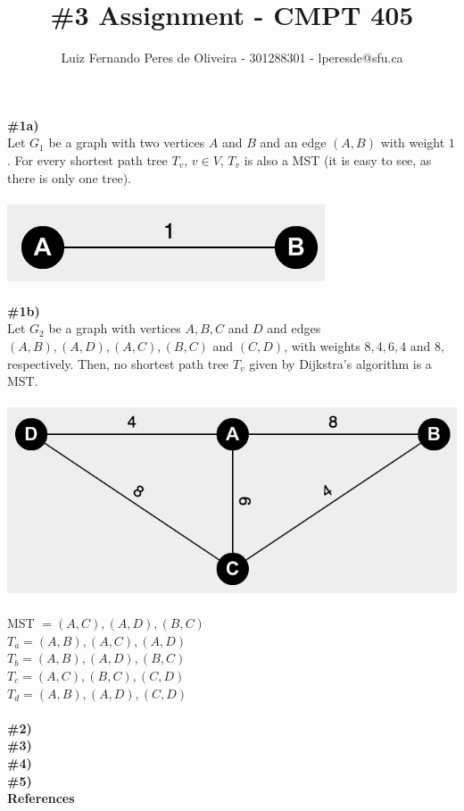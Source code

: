 \documentclass{article}
\title{\#3 Assignment - CMPT 405}
\author{Luiz Fernando Peres de Oliveira - 301288301 - lperesde@sfu.ca}
\begin{document}
\maketitle
\textbf{\#1a)}
\\
Let $G_1$ be a graph with two vertices $A$ and $B$ and an edge $(A, B)$ with weight $1$. For every shortest path tree $T_v$, $v \in V$, $T_v$ is also a MST (it is easy to see, as there is only one tree).
\\
\\
\includegraphics[scale=0.6]{simple_graph_hw3}
\\
\\
\textbf{\#1b)}
\\
Let $G_2$ be a graph with vertices $A, B, C$ and $D$ and edges $(A, B), (A, D), (A,C), (B,C)$ and $(C,D)$, with weights $8, 4, 6, 4 \text{ and } 8$, respectively. Then, no shortest path tree $T_v$ given by Dijkstra's algorithm is a MST.
\\
\\
\includegraphics[scale=0.4]{complex_graph_hw3}
\\
\\
MST $= (A,C), (A,D), (B,C)$
\\
$T_a = (A, B), (A, C), (A, D)$
\\
$T_b = (A, B), (A, D), (B, C)$
\\
$T_c = (A, C), (B, C), (C, D)$
\\
$T_d = (A, B), (A, D), (C, D)$
\\
\\
\textbf{\#2)}
\\
\textbf{\#3)}
\\
\textbf{\#4)}
\\
\textbf{\#5)}
\\
\textbf{References}
\\
\end{document}
